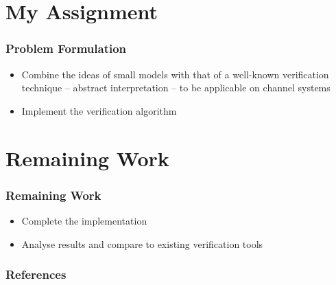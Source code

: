\documentclass{beamer}
\begin{document}
\section{My Assignment}
\begin{frame}
  \frametitle{Problem Formulation}
  \begin{itemize}
  \item
    Combine the ideas of small models with that of a well-known verification technique -- abstract interpretation – to be applicable on channel systems
  \item
    Implement the verification algorithm
  \end{itemize}
\end{frame}
\section{Remaining Work}
\begin{frame}
  \frametitle{Remaining Work}
  \begin{itemize}
  \item
    Complete the implementation
  \item
    Analyse results and compare to existing verification tools
  \end{itemize}
\end{frame}

\begin{frame}
  \frametitle{References}
  \printbibliography
\end{frame}

\begin{frame}[plain]
  \begin{centering}
    \par
  \end{centering}
\end{frame}
\end{document}
